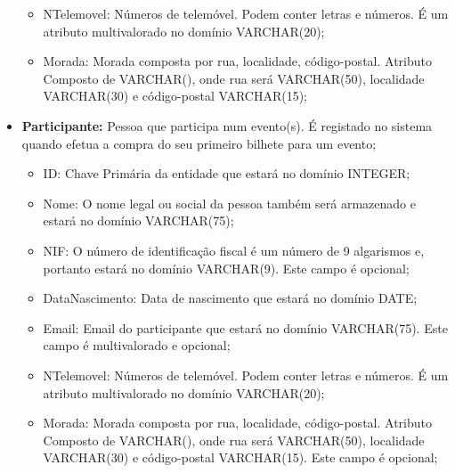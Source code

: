 \documentclass[a4paper,12pt]{scrreprt}
\begin{document}
\begin{itemize}
\begin{itemize}
                     \item{NTelemovel:} Números de telemóvel. Podem conter letras e números. É um atributo multivalorado no domínio VARCHAR(20);
                       
                     \item{Morada:} Morada composta por rua, localidade, código-postal. Atributo Composto de VARCHAR(), onde rua será VARCHAR(50), localidade VARCHAR(30) e código-postal VARCHAR(15);
                       
                     \end{itemize}
                 \item{\textbf{Participante:}} Pessoa que participa num evento(s). É registado no sistema quando efetua a compra do seu primeiro bilhete para um evento;
                     \begin{itemize}
                     \item{ID:} Chave Primária da entidade que estará no domínio INTEGER;
                       
                     \item{Nome:} O nome legal ou social da pessoa também será armazenado e estará
                       no domínio VARCHAR(75);
                       
                     \item{NIF:} O número de identificação fiscal é um número de 9 algarismos e, portanto estará no domínio VARCHAR(9). Este campo é opcional;
                       
                     \item{DataNascimento:} Data de nascimento que estará no domínio DATE;
                       
                     \item{Email:} Email do participante que estará no domínio VARCHAR(75). Este campo é multivalorado e opcional;
                       
                     \item{NTelemovel:} Números de telemóvel. Podem conter letras e números. É um atributo multivalorado no domínio VARCHAR(20);
                       
                     \item{Morada:} Morada composta por rua, localidade, código-postal. Atributo Composto de VARCHAR(), onde rua será VARCHAR(50), localidade VARCHAR(30) e código-postal VARCHAR(15). Este campo é opcional;
                       

\end{itemize}
\end{itemize}
\end{document}
